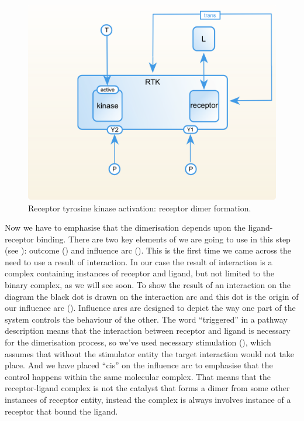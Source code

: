 \begin{figure}[H]
  \centering
  \vspace*{-0.75em}
  \includegraphics[scale=0.75]{examples/rtk-dimerisation.png}
   \caption{Receptor tyrosine kinase activation: receptor dimer formation.}
  \label{fig:rtk-dimerisation}
\end{figure}

Now we have to emphasise that the dimerisation depends upon the ligand-receptor binding. There are two key elements of \SBGNERLone we are going to use in this step (see ): outcome () and influence arc (). This is the first time we came across the need to use a result of interaction. In our case the result of interaction is a complex containing instances of receptor and ligand, but not limited to the binary complex, as we will see soon. To show the result of an interaction on the diagram the black dot is drawn on the interaction arc and this dot is the origin of our influence arc (). Influence arcs are designed to depict the way one part of the system controls the behaviour of the other. The word ``triggered'' in a pathway description means that the interaction between receptor and ligand is necessary for the dimerisation process, so we've used necessary stimulation (), which assumes that without the stimulator entity the target interaction would not take place. And we have placed ``cis''  on the influence arc to emphasise that the control happens within the same molecular complex. That means that the receptor-ligand complex is not the catalyst that forms a dimer from some other instances of receptor entity, instead the complex is always involves instance of a receptor that bound the ligand.
 
